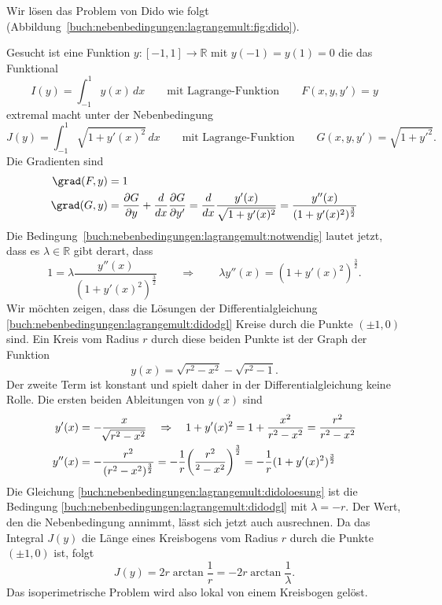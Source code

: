 \begin{beispiel}
Wir lösen das Problem von Dido wie folgt
(Abbildung~\ref{buch:nebenbedingungen:lagrangemult:fig:dido}).

Gesucht ist eine Funktion $y\colon[-1,1]\to\mathbb{R}$ mit $y(-1)=y(1)=0$
die das Funktional
\[
I(y)
=
\int_{-1}^1 y(x)\,dx
\qquad
\text{mit Lagrange-Funktion}
\qquad
F(x,y,y') = y
\]
extremal macht unter der Nebenbedingung 
\[
J(y)
=
\int_{-1}^1 \sqrt{1+y'(x)^2}\,dx
\qquad
\text{mit Lagrange-Funktion}
\qquad
G(x,y,y') = \sqrt{1+y'^2}.
\]
Die Gradienten sind
\begin{align*}
\grad(F,y)
&=
1
\\
\grad(G,y)
&=
\frac{\partial G}{\partial y}
+
\frac{d}{dx}
\frac{\partial G}{\partial y'}
=
\frac{d}{dx}
\frac{y'(x)}{\sqrt{1+y'(x)^2}}
=
\frac{
y''(x)
}{
(1+y'(x)^2)^{\frac32}
}
\end{align*}
Die Bedingung~\eqref{buch:nebenbedingungen:lagrangemult:notwendig} lautet
jetzt, dass es $\lambda\in\mathbb{R}$ gibt derart, dass
\begin{equation}
1 = \lambda\frac{y''(x)}{(1+y'(x)^2)^{\frac32}}
\qquad\Rightarrow\qquad
\lambda y''(x)= (1+y'(x)^2)^{\frac32}.
\label{buch:nebenbedingungen:lagrangemult:didodgl}
\end{equation}
Wir möchten zeigen, dass die Lösungen der Differentialgleichung
\eqref{buch:nebenbedingungen:lagrangemult:didodgl}
Kreise durch die Punkte $(\pm1, 0)$ sind.
Ein Kreis vom Radius $r$ durch diese beiden Punkte ist der Graph
der Funktion
\[
y(x) = \sqrt{r^2-x^2} - \sqrt{r^2-1}.
\]
Der zweite Term ist konstant und spielt daher in der Differentialgleichung
keine Rolle.
Die ersten beiden Ableitungen von $y(x)$ sind
\begin{align}
y'(x)
&=
-\frac{x}{\!\sqrt{r^2-x^2}}
\quad\Rightarrow\quad
1+y'(x)^2
=
1+\frac{x^2}{r^2-x^2}
=
\frac{r^2}{r^2-x^2}
\notag
\\
y''(x)
&=
-
\frac{
r^2
}{
(r^2-x^2)^{\frac32}
}
=
-\frac{1}{r}
\biggl(
\frac{r^2}{^2-x^2}
\biggr)^{\frac32}
=
-\frac{1}{r}
(1+y'(x)^2)^{\frac32}
\label{buch:nebenbedingungen:lagrangemult:didoloesung}
\end{align}
Die Gleichung \eqref{buch:nebenbedingungen:lagrangemult:didoloesung}
ist die Bedingung \eqref{buch:nebenbedingungen:lagrangemult:didodgl}
mit $\lambda=-r$.
Der Wert, den die Nebenbedingung annimmt, lässt sich jetzt auch
ausrechnen.
Da das Integral $J(y)$ die Länge eines Kreisbogens vom Radius $r$ 
durch die Punkte $(\pm1,0)$ ist, folgt
\[
J(y)
=
2r\arctan\frac{1}{r}
=
-2r\arctan\frac{1}{\lambda}.
\]
Das isoperimetrische Problem wird also lokal von einem Kreisbogen
gelöst.
\end{beispiel}

